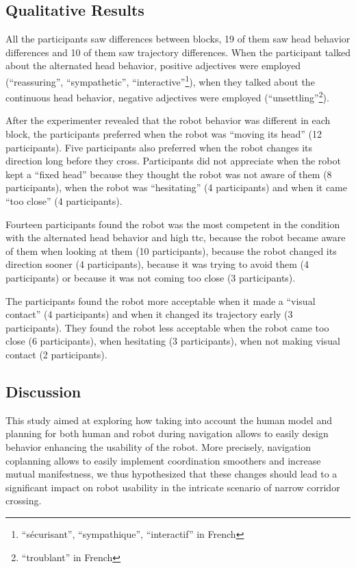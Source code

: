 \documentclass[a4paper,11pt,twoside]{StyleThese}
\begin{document}
\subsection{Qualitative Results}
All the participants saw differences between blocks, 19 of them saw head behavior differences and 10 of them saw trajectory differences. When the participant talked about the alternated head behavior, positive adjectives were employed (``reassuring'', ``sympathetic'', ``interactive''\footnote{``sécurisant'', ``sympathique'', ``interactif'' in French}), when they talked about the continuous head behavior, negative adjectives were employed (``unsettling''\footnote{``troublant'' in French}).

After the experimenter revealed that the robot behavior was different in each block, the participants preferred when the robot was ``moving its head'' (12 participants). Five participants also preferred when the robot changes its direction long before they cross. Participants did not appreciate when the robot kept a ``fixed head'' because they thought the robot was not aware of them (8 participants), when the robot was ``hesitating'' (4 participants) and when it came ``too close'' (4 participants).

Fourteen participants found the robot was the most competent in the condition with the alternated head behavior and high \acrshort{ttc}, because the robot became aware of them when looking at them (10 participants), because the robot changed its direction sooner (4 participants), because it was trying to avoid them (4 participants) or because it was not coming too close (3 participants).

The participants found the robot more acceptable when it made a ``visual contact'' (4 participants) and when it changed its trajectory early (3 participants). They found the robot less acceptable when the robot came too close (6 participants), when hesitating (3 participants), when not making visual contact (2 participants).


\subsection{Discussion}
This study aimed at exploring how taking into account the human model and planning for both human and robot during navigation allows to easily design behavior enhancing the usability of the robot. More precisely, navigation coplanning allows to easily implement coordination smoothers and increase mutual manifestness, we thus hypothesized that these changes should lead to a significant impact on robot usability in the intricate scenario of narrow corridor crossing.
\end{document}
